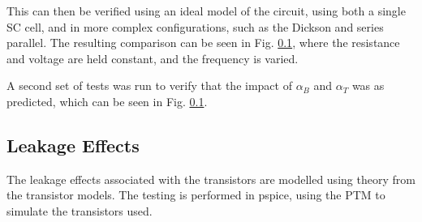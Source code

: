 \documentclass[conference]{IEEEtran}
\begin{document}
	This can then be verified using an ideal model of the circuit, using both a single SC cell, and in more complex configurations, such as the Dickson and series parallel. The resulting comparison can be seen in Fig. \ref{}, where the resistance and voltage are held constant, and the frequency is varied.
	
	A second set of tests was run to verify that the impact of $\alpha_B$ and $\alpha_T$ was as predicted, which can be seen in Fig. \ref{}.
	
	\subsection{Leakage Effects}
	The leakage effects associated with the transistors are modelled using theory from the \cite{} transistor models. The testing is performed in pspice, using the PTM to simulate the transistors used. 
	
	
		
	
	
	
\end{document}
